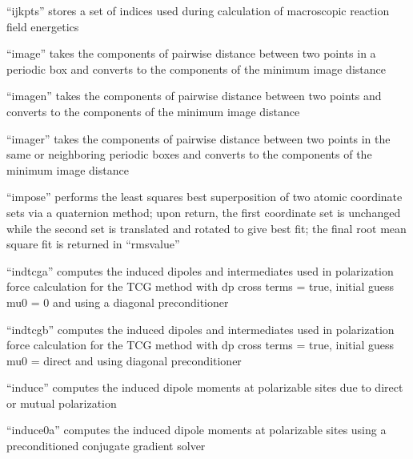 \documentclass[letterpaper,11pt,english]{sphinxmanual}
\begin{document}

“ijkpts” stores a set of indices used during calculation
of macroscopic reaction field energetics


“image” takes the components of pairwise distance between
two points in a periodic box and converts to the components
of the minimum image distance


“imagen” takes the components of pairwise distance between
two points and converts to the components of the minimum
image distance


“imager” takes the components of pairwise distance between
two points in the same or neighboring periodic boxes and
converts to the components of the minimum image distance


“impose” performs the least squares best superposition
of two atomic coordinate sets via a quaternion method;
upon return, the first coordinate set is unchanged while
the second set is translated and rotated to give best fit;
the final root mean square fit is returned in “rmsvalue”


“indtcga” computes the induced dipoles and intermediates used
in polarization force calculation for the TCG method with dp
cross terms = true, initial guess mu0 = 0 and using a diagonal
preconditioner


“indtcgb” computes the induced dipoles and intermediates used
in polarization force calculation for the TCG method with dp
cross terms = true, initial guess mu0 = direct and using diagonal
preconditioner


“induce” computes the induced dipole moments at polarizable
sites due to direct or mutual polarization


“induce0a” computes the induced dipole moments at polarizable
sites using a preconditioned conjugate gradient solver

\end{document}
